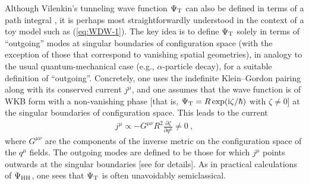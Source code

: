 \documentclass[12pt]{iopart}
\def\eq#1{\begin{equation}\begin{aligned}#1\end{aligned}\end{equation}}
\def\eref#1{(\ref{eq:#1})}
\def\I{\mathrm{i}}
\def\del#1#2{\frac{\partial#1}{\partial#2}}
\begin{document}
Although Vilenkin's tunneling wave function $\Psi_{\rm T}$ can also be defined in terms of a path integral \citep{Vilenkin:2018dch,Vilenkin:2018oja}, it is perhaps most straightforwardly understood in the context of a toy model such as \eref{WDW-1}. The key idea is to define $\Psi_{\rm T}$ solely in terms of ``outgoing'' modes at singular boundaries of configuration space (with the exception of those that correspond to vanishing spatial geometries), in analogy to the usual quantum-mechanical case (e.g., $\alpha$-particle decay), for a suitable definition of ``outgoing''. Concretely, one uses the indefinite Klein--Gordon pairing along with its conserved current $j^{\mu}$, and one assumes that the wave function is of WKB form with a non-vanishing phase [that is, $\Psi_{\rm T} = R\exp(\I\zeta/\hbar)$ with $\zeta\neq0$] at the singular boundaries of configuration space. This leads to the current
\eq{
j^{\mu} \propto -G^{\mu\nu}R^2\del{\zeta}{q^{\mu}}\neq0 \ ,
}
where $G^{\mu\nu}$ are the components of the inverse metric on the configuration space of the $q^{\mu}$ fields. The outgoing modes are defined to be those for which $j^{\mu}$ points outwards at the singular boundaries [see \citet{Vilenkin:1987kf,Vilenkin:2018dch,Kiefer:book} for details]. As in practical calculations of $\Psi_{\rm HH}$, one sees that $\Psi_{\rm T}$ is often unavoidably semiclassical.
\end{document}
